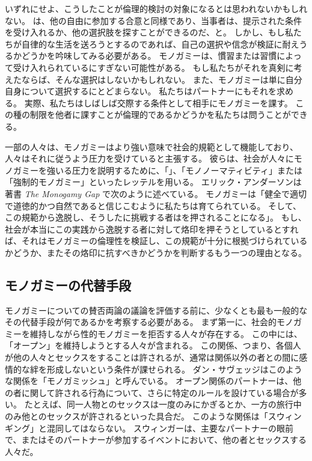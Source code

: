 \documentclass[paper=a4,book,openany]{jlreq} \usepackage{mystyle}
\begin{document}
いずれにせよ、こうしたことが倫理的検討の対象になるとは思われないかもしれない。
は、他の自由に参加する合意と同様であり、当事者は、提示された条件を受け入れるか、他の選択肢を探すことができるのだ、と。
しかし、もし私たちが自律的な生活を送ろうとするのであれば、自己の選択や信念が検証に耐えうるかどうかを吟味してみる必要がある。
モノガミーは、慣習または習慣によって受け入れられているにすぎない可能性がある。
もし私たちがそれを真剣に考えたならば、そんな選択はしないかもしれない。
また、モノガミーは単に自分自身について選択するにとどまらない。
私たちはパートナーにもそれを求める。
実際、私たちはしばしば交際する条件として相手にモノガミーを課す。
この種の制限を他者に課すことが倫理的であるかどうかを私たちは問うことができる。

一部の人々は、モノガミーはより強い意味で社会的規範として機能しており、人々はそれに従うよう圧力を受けていると主張する。
彼らは、社会が人々にモノガミーを強いる圧力を説明するために、「」、「モノノーマティビティ」または「強制的モノガミー」といったレッテルを用いる\citep[p.277]{emens04:_monog_law}。
エリック・アンダーソンは著書 \emph{The Monogamy Gap} で次のように述べている。
モノガミーは「健全で適切で道徳的かつ自然であると信じこむように私たちは育てられている。
そして、この規範から逸脱し、そうしたに挑戦する者はを押されることになる」\citep{anderson11:_monog_gap}。
もし、社会が本当にこの実践から逸脱する者に対して烙印を押そうとしているとすれば、それはモノガミーの倫理性を検証し、この規範が十分に根拠づけられているかどうか、またその烙印に抗すべきかどうかを判断するもう一つの理由となる。

\subsection{モノガミーの代替手段}

モノガミーについての賛否両論の議論を評価する前に、少なくとも最も一般的なその代替手段が何であるかを考察する必要がある。
まず第一に、社会的モノガミーを維持しながら性的モノガミーを拒否する人々が存在する。
この中には、「オープン」を維持しようとする人々が含まれる。
この関係、つまり、各個人が他の人々とセックスをすることは許されるが、通常は関係以外の者との間に感情的な絆を形成しないという条件が課せられる。
ダン・サヴェッジはこのような関係を「モノガミッシュ」と呼んでいる\citep{savage12:_savag_monogamish}。
オープン関係のパートナーは、他の者に関して許される行為について、さらに特定のルールを設けている場合が多い。
たとえば、同一人物とのセックスは一度のみにかぎるとか、一方の旅行中のみ他とのセックスが許されるといった具合だ。
このような関係は「スウィンギング」と混同してはならない。
スウィンガーは、主要なパートナーの眼前で、またはそのパートナーが参加するイベントにおいて、他の者とセックスする人々だ。
\end{document}
